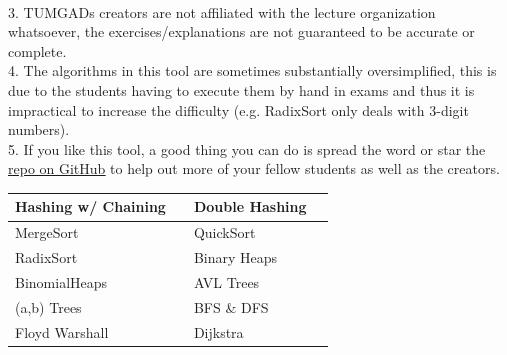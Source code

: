 \documentclass[12pt]{article}
\begin{document}
    \\[0.2in]
    3. TUMGADs creators are not affiliated with the lecture organization whatsoever, the exercises/explanations are not
    guaranteed to be accurate or complete.
    \\[0.2in]
    4. The algorithms in this tool are sometimes substantially oversimplified, this is due to the students having to execute them by hand in exams
    and thus it is impractical to increase the difficulty (e.g. RadixSort only deals with 3-digit numbers).
    \\[0.2in]
    5. If you like this tool, a good thing you can do is spread the word or star the \href{https://github.com/ossner/TUMGAD/}{\underline{repo on GitHub}} to help out more of your fellow students as well as the creators.
    \vspace{20px}
    \begin{center}
        \begin{tabular}{|P{4cm}|P{1cm}||P{4cm}|P{1cm}|}
            \hline
            Hashing w/ Chaining & %
            & Double Hashing & %
            \\ \hline
            MergeSort & %
            & QuickSort & %
            \\ \hline
            RadixSort & %
            & Binary Heaps & %
            \\ \hline
            BinomialHeaps & %
            & AVL Trees & %
            \\ \hline
            (a,b) Trees & %
            & BFS \& DFS & %
            \\ \hline
            Floyd Warshall & %
            & Dijkstra & %
            \\ \hline
        \end{tabular}
    \end{center}
\end{document}
